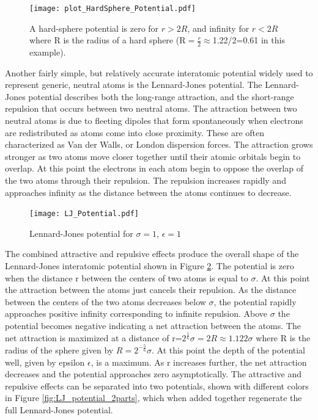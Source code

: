 \documentclass[double,12pt]{beavtex}
\begin{document}
\begin{figure}
    \centering
    \texttt{[image: plot\_HardSphere\_Potential.pdf]}
    \caption{A hard-sphere potential is zero for $r>2R$, and infinity 
    for $r<{2R}$ where R is the radius of a hard sphere 
    (R$=\frac{r}{2}\approx$1.22/2=0.61 in this example).}
    \label{fig:HardSphere_potential}
  \end{figure}

Another fairly simple, but relatively accurate interatomic potential widely 
used to represent generic, neutral atoms is the Lennard-Jones potential. 
The Lennard-Jones potential describes both the long-range attraction, 
and the short-range repulsion that occurs between two neutral atoms. 
The attraction between two neutral atoms is due to fleeting dipoles that 
form spontaneously when electrons are redistributed as atoms come into 
close proximity. These are often characterized as Van der Walls, or London 
dispersion forces. The attraction grows stronger as two atoms move closer 
together until their atomic orbitals begin to overlap. 
At this point the electrons in each atom begin to oppose the overlap of 
the two atoms through their repulsion. The repulsion increases rapidly and 
approaches infinity as the distance between the atoms continues to decrease.  
 
\begin{figure}
    \centering
    \texttt{[image: LJ\_Potential.pdf]}
    \caption{Lennard-Jones potential for $\sigma=1$, $\epsilon=1$}
    \label{fig:LJ_potential}
  \end{figure}

The combined attractive and repulsive effects produce the overall shape of 
the Lennard-Jones interatomic potential shown in Figure \ref{fig:LJ_potential}. 
The potential is zero when the distance r between the centers of two atoms 
is equal to $\sigma$. At this point 
the attraction between the atoms just cancels their repulsion. As the distance 
between the centers of the two atoms decreases below $\sigma$, the potential 
rapidly approaches positive infinity corresponding to infinite repulsion. 
Above $\sigma$ the potential becomes negative indicating a net attraction 
between the atoms. The net attraction is maximized at a distance of 
r=$2^\frac{1}{6}\sigma=2R\approx{1.122}\sigma$ where R is the radius of 
the sphere given by $R={2^{-\frac{5}{6}}}\sigma$. At this point the depth of
the potential well, given by epsilon $\epsilon$, is a maximum. As r increases 
further, the net attraction decreases and the potential approaches zero
asymptotically. The attractive and repulsive effects can be separated into two
potentials, shown with different colors in Figure \ref{fig:LJ_potential_2parts}, 
which when added together regenerate the full Lennard-Jones potential. 
\end{document}

